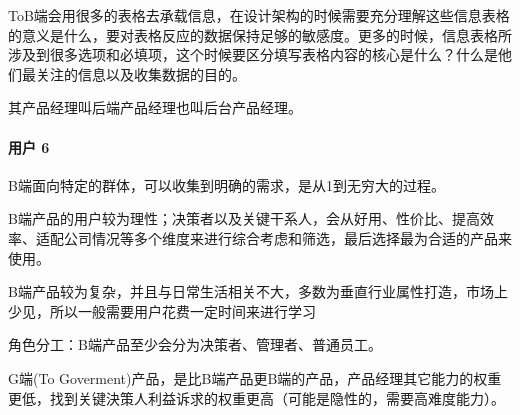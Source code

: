 \documentclass[letterpaper,10pt,english]{sphinxmanual}
\begin{document}
ToB端会用很多的表格去承载信息，在设计架构的时候需要充分理解这些信息表格的意义是什么，要对表格反应的数据保持足够的敏感度。更多的时候，信息表格所涉及到很多选项和必填项，这个时候要区分填写表格内容的核心是什么？什么是他们最关注的信息以及收集数据的目的。
%
\begin{footnote}[69]\sphinxAtStartFootnote
{}
%
\end{footnote}

其产品经理叫后端产品经理也叫后台产品经理。%
\begin{footnote}[70]\sphinxAtStartFootnote
{}
%
\end{footnote}


\paragraph{用户 6\sphinxfootnotemark[71]}
\label{\detokenize{chapter_introduction/2B:id2}}%
\begin{footnotetext}[71]\sphinxAtStartFootnote
{}
%
\end{footnotetext}\ignorespaces 
B端面向特定的群体，可以收集到明确的需求，是从1到无穷大的过程。
%
\begin{footnote}[72]\sphinxAtStartFootnote
{}
%
\end{footnote}

B端产品的用户较为理性；决策者以及关键干系人，会从好用、性价比、提高效率、适配公司情况等多个维度来进行综合考虑和筛选，最后选择最为合适的产品来使用。

B端产品较为复杂，并且与日常生活相关不大，多数为垂直行业属性打造，市场上少见，所以一般需要用户花费一定时间来进行学习

角色分工：B端产品至少会分为决策者、管理者、普通员工。

G端(To
Goverment)产品，是比B端产品更B端的产品，产品经理其它能力的权重更低，找到关键決策人利益诉求的权重更高（可能是隐性的，需要高难度能力）。%
\begin{footnote}[73]\sphinxAtStartFootnote
{}
%
\end{footnote}
\end{document}
